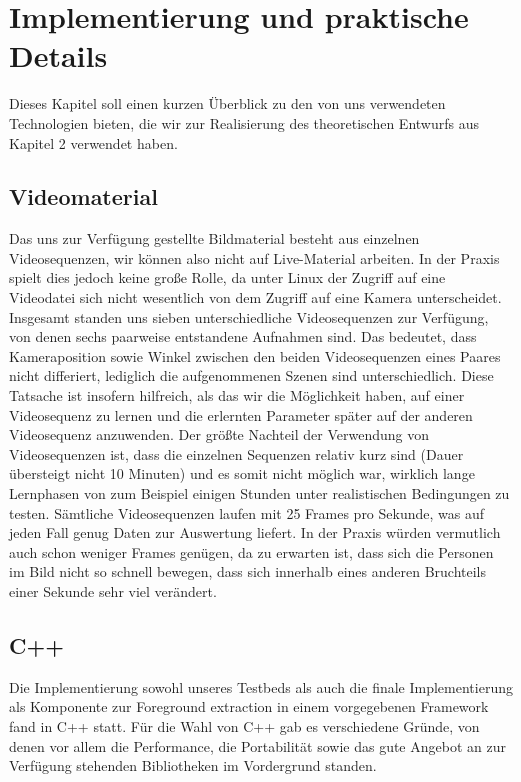 \chapter{Implementierung und praktische Details}

Dieses Kapitel soll einen kurzen Überblick zu den von uns verwendeten Technologien bieten, die wir zur Realisierung des theoretischen Entwurfs aus Kapitel 2 verwendet haben.

\section{Videomaterial}
Das uns zur Verfügung gestellte Bildmaterial besteht aus einzelnen Videosequenzen, wir können also nicht auf Live-Material arbeiten.
In der Praxis spielt dies jedoch keine große Rolle, da unter Linux der Zugriff auf eine Videodatei sich nicht wesentlich von dem Zugriff auf eine Kamera unterscheidet.
Insgesamt standen uns sieben unterschiedliche Videosequenzen zur Verfügung, von denen sechs paarweise entstandene Aufnahmen sind. Das bedeutet, dass Kameraposition sowie Winkel zwischen den beiden Videosequenzen eines Paares nicht differiert, lediglich die aufgenommenen Szenen sind unterschiedlich. Diese Tatsache ist insofern hilfreich, als das wir die Möglichkeit haben, auf einer Videosequenz zu lernen und die erlernten Parameter später auf der anderen Videosequenz anzuwenden.
Der größte Nachteil der Verwendung von Videosequenzen ist, dass die einzelnen Sequenzen relativ kurz sind (Dauer übersteigt nicht 10 Minuten) und es somit nicht möglich war, wirklich lange Lernphasen von zum Beispiel einigen Stunden unter realistischen Bedingungen zu testen.
Sämtliche Videosequenzen laufen mit 25 Frames pro Sekunde, was auf jeden Fall genug Daten zur Auswertung liefert. In der Praxis würden vermutlich auch schon weniger Frames genügen, da zu erwarten ist, dass sich die Personen im Bild nicht so schnell bewegen, dass sich innerhalb eines anderen Bruchteils einer Sekunde sehr viel verändert.

\section{C++}
Die Implementierung sowohl unseres Testbeds als auch die finale Implementierung als Komponente zur Foreground extraction in einem vorgegebenen Framework fand in C++ statt. Für die Wahl von C++ gab es verschiedene Gründe, von denen vor allem die Performance, die Portabilität sowie das gute Angebot an zur Verfügung stehenden Bibliotheken im Vordergrund standen. 

